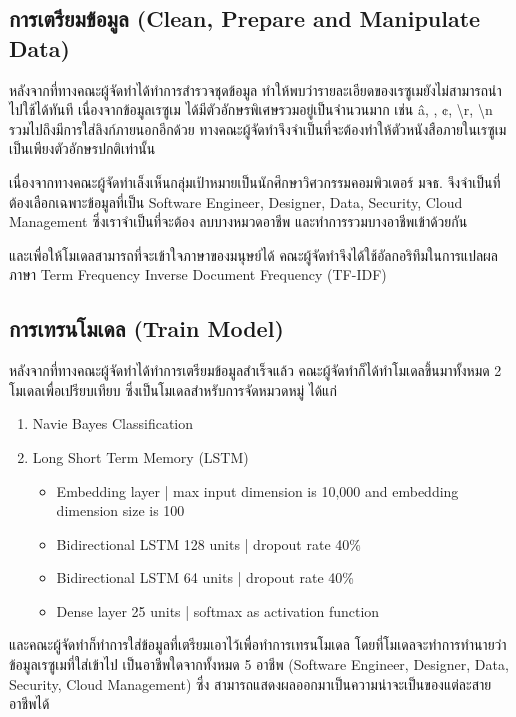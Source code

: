 \subsection{การเตรียมข้อมูล (Clean, Prepare and Manipulate Data)}
หลังจากที่ทางคณะผู้จัดทำได้ทำการสำรวจชุดข้อมูล ทำให้พบว่ารายละเอียดของเรซูเมยังไม่สามารถนำไปใช้ได้ทันที
เนื่องจากข้อมูลเรซูเม ได้มีตัวอักษรพิเศษรวมอยู่เป็นจำนวนมาก เช่น \^a, , ¢, \textbackslash r, \textbackslash n
รวมไปถึงมีการใส่ลิงก์ภายนอกอีกด้วย ทางคณะผู้จัดทำจึงจำเป็นที่จะต้องทำให้ตัวหนังสือภายในเรซูเม เป็นเพียงตัวอักษรปกติเท่านั้น
\par เนื่องจากทางคณะผู้จัดทำเล็งเห็นกลุ่มเป้าหมายเป็นนักศึกษาวิศวกรรมคอมพิวเตอร์ มจธ. จึงจำเป็นที่ต้องเลือกเฉพาะข้อมูลที่เป็น
Software Engineer, Designer, Data, Security, Cloud Management ซึ่งเราจำเป็นที่จะต้อง
ลบบางหมวดอาชีพ และทำการรวมบางอาชีพเข้าด้วยกัน
\par และเพื่อให้โมเดลสามารถที่จะเข้าใจภาษาของมนุษย์ได้ คณะผู้จัดทำจึงได้ใช้อัลกอริทึมในการแปลผลภาษา
Term Frequency Inverse Document Frequency (TF-IDF)

\subsection{การเทรนโมเดล (Train Model)}
หลังจากที่ทางคณะผู้จัดทำได้ทำการเตรียมข้อมูลสำเร็จแล้ว คณะผู้จัดทำก็ได้ทำโมเดลขึ้นมาทั้งหมด 2 โมเดลเพื่อเปรียบเทียบ
ซึ่งเป็นโมเดลสำหรับการจัดหมวดหมู่ ได้แก่
\begin{enumerate}
    \item Navie Bayes Classification
    \item Long Short Term Memory (LSTM)
          \begin{itemize}
              \item Embedding layer              | max input dimension is 10,000 and embedding dimension size is 100
              \item Bidirectional LSTM 128 units | dropout rate 40\%
              \item Bidirectional LSTM 64 units  | dropout rate 40\%
              \item Dense layer 25 units         | softmax as activation function
          \end{itemize}
\end{enumerate}
\par และคณะผู้จัดทำก็ทำการใส่ข้อมูลที่เตรียมเอาไว้เพื่อทำการเทรนโมเดล โดยที่โมเดลจะทำการทำนายว่าข้อมูลเรซูเมที่ใส่เข้าไป
เป็นอาชีพใดจากทั้งหมด 5 อาชีพ (Software Engineer, Designer, Data, Security, Cloud Management) ซึ่ง
สามารถแสดงผลออกมาเป็นความน่าจะเป็นของแต่ละสายอาชีพได้

